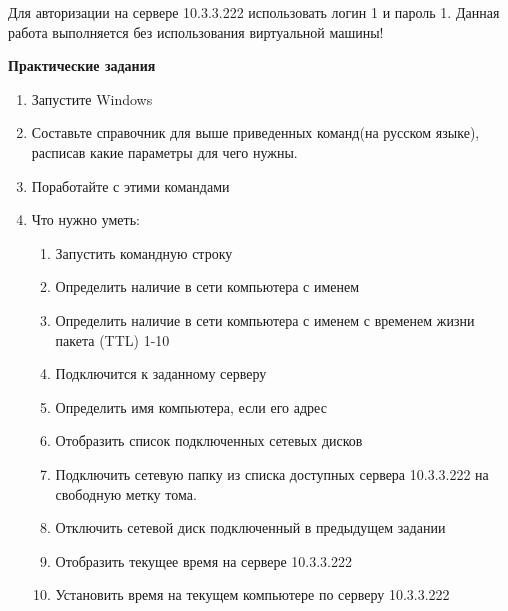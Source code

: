 \documentclass[a4paper,12pt]{article}
\begin{document}
  \begin{flushleft}
   Для авторизации на сервере 10.3.3.222 использовать логин 1 и пароль 1. Данная работа выполняется без использования виртуальной машины!
  \end{flushleft}


  \newpage

  \begin{center}
    {\bf Практические задания}
  \end{center}

  \begin{flushleft}
    \begin{enumerate} [1. ]
     \item Запустите Windows
     \item Составьте справочник для выше приведенных команд(на русском языке), расписав какие параметры для чего нужны.
     \item Поработайте с этими командами
     \item Что нужно уметь:
      \begin{enumerate} [\bf a. ]
        \item Запустить командную строку
        \item Определить наличие в сети компьютера с именем 
        
        \item Определить наличие в сети компьютера с именем  с временем жизни пакета (TTL) 1-10
     
        \item Подключится к заданному серверу 
        \item Определить имя компьютера, если его адрес 
    
        \item Отобразить список подключенных сетевых дисков
      
        \item Подключить сетевую папку из списка доступных сервера 10.3.3.222 на свободную метку тома.
  
        \item Отключить сетевой диск подключенный в предыдущем задании
       
        \item Отобразить текущее время на сервере 10.3.3.222
       
        \item Установить время на текущем компьютере по серверу 10.3.3.222
        

\end{enumerate}
\end{enumerate}
\end{flushleft}
\end{document}
